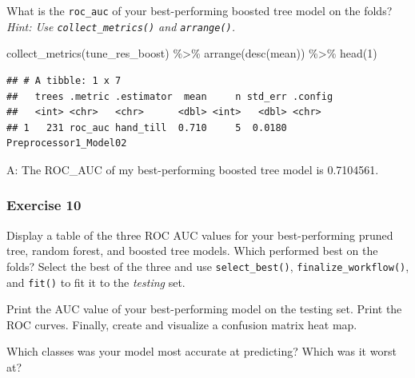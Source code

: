 \documentclass[
]{article}
\newenvironment{Shaded}{\begin{snugshade}}{\end{snugshade}}
\newcommand{\DecValTok}[1]{\textcolor[rgb]{0.00,0.00,0.81}{#1}}
\newcommand{\FunctionTok}[1]{\textcolor[rgb]{0.00,0.00,0.00}{#1}}
\newcommand{\NormalTok}[1]{#1}
\newcommand{\SpecialCharTok}[1]{\textcolor[rgb]{0.00,0.00,0.00}{#1}}
\begin{document}
What is the \texttt{roc\_auc} of your best-performing boosted tree model
on the folds? \emph{Hint: Use \texttt{collect\_metrics()} and
\texttt{arrange()}.}

\begin{Shaded}
\begin{Highlighting}[]
\FunctionTok{collect\_metrics}\NormalTok{(tune\_res\_boost) }\SpecialCharTok{\%\textgreater{}\%} \FunctionTok{arrange}\NormalTok{(}\FunctionTok{desc}\NormalTok{(mean)) }\SpecialCharTok{\%\textgreater{}\%} \FunctionTok{head}\NormalTok{(}\DecValTok{1}\NormalTok{)}
\end{Highlighting}
\end{Shaded}

\begin{verbatim}
## # A tibble: 1 x 7
##   trees .metric .estimator  mean     n std_err .config              
##   <int> <chr>   <chr>      <dbl> <int>   <dbl> <chr>                
## 1   231 roc_auc hand_till  0.710     5  0.0180 Preprocessor1_Model02
\end{verbatim}

A: The ROC\_AUC of my best-performing boosted tree model is 0.7104561.

\hypertarget{exercise-10}{%
\subsubsection{Exercise 10}\label{exercise-10}}

Display a table of the three ROC AUC values for your best-performing
pruned tree, random forest, and boosted tree models. Which performed
best on the folds? Select the best of the three and use
\texttt{select\_best()}, \texttt{finalize\_workflow()}, and
\texttt{fit()} to fit it to the \emph{testing} set.

Print the AUC value of your best-performing model on the testing set.
Print the ROC curves. Finally, create and visualize a confusion matrix
heat map.

Which classes was your model most accurate at predicting? Which was it
worst at?
\end{document}
